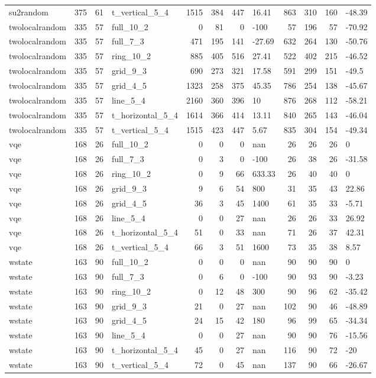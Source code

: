 \begin{longtable}{lrrlrrrlrrrl}
su2random & 375 & 61 & t\_vertical\_5\_4 & 1515 & 384 & 447 & 16.41 & 863 & 310 & 160 & -48.39 \\
twolocalrandom & 335 & 57 & full\_10\_2 & 0 & 81 & 0 & -100 & 57 & 196 & 57 & -70.92 \\
twolocalrandom & 335 & 57 & full\_7\_3 & 471 & 195 & 141 & -27.69 & 632 & 264 & 130 & -50.76 \\
twolocalrandom & 335 & 57 & ring\_10\_2 & 885 & 405 & 516 & 27.41 & 522 & 402 & 215 & -46.52 \\
twolocalrandom & 335 & 57 & grid\_9\_3 & 690 & 273 & 321 & 17.58 & 591 & 299 & 151 & -49.5 \\
twolocalrandom & 335 & 57 & grid\_4\_5 & 1323 & 258 & 375 & 45.35 & 786 & 254 & 138 & -45.67 \\
twolocalrandom & 335 & 57 & line\_5\_4 & 2160 & 360 & 396 & 10 & 876 & 268 & 112 & -58.21 \\
twolocalrandom & 335 & 57 & t\_horizontal\_5\_4 & 1614 & 366 & 414 & 13.11 & 840 & 265 & 143 & -46.04 \\
twolocalrandom & 335 & 57 & t\_vertical\_5\_4 & 1515 & 423 & 447 & 5.67 & 835 & 304 & 154 & -49.34 \\
vqe & 168 & 26 & full\_10\_2 & 0 & 0 & 0 & nan & 26 & 26 & 26 & 0 \\
vqe & 168 & 26 & full\_7\_3 & 0 & 3 & 0 & -100 & 26 & 38 & 26 & -31.58 \\
vqe & 168 & 26 & ring\_10\_2 & 0 & 9 & 66 & 633.33 & 26 & 40 & 40 & 0 \\
vqe & 168 & 26 & grid\_9\_3 & 9 & 6 & 54 & 800 & 31 & 35 & 43 & 22.86 \\
vqe & 168 & 26 & grid\_4\_5 & 36 & 3 & 45 & 1400 & 61 & 35 & 33 & -5.71 \\
vqe & 168 & 26 & line\_5\_4 & 0 & 0 & 27 & nan & 26 & 26 & 33 & 26.92 \\
vqe & 168 & 26 & t\_horizontal\_5\_4 & 51 & 0 & 33 & nan & 71 & 26 & 37 & 42.31 \\
vqe & 168 & 26 & t\_vertical\_5\_4 & 66 & 3 & 51 & 1600 & 73 & 35 & 38 & 8.57 \\
wstate & 163 & 90 & full\_10\_2 & 0 & 0 & 0 & nan & 90 & 90 & 90 & 0 \\
wstate & 163 & 90 & full\_7\_3 & 0 & 6 & 0 & -100 & 90 & 93 & 90 & -3.23 \\
wstate & 163 & 90 & ring\_10\_2 & 0 & 12 & 48 & 300 & 90 & 96 & 62 & -35.42 \\
wstate & 163 & 90 & grid\_9\_3 & 21 & 0 & 27 & nan & 102 & 90 & 46 & -48.89 \\
wstate & 163 & 90 & grid\_4\_5 & 24 & 15 & 42 & 180 & 96 & 99 & 65 & -34.34 \\
wstate & 163 & 90 & line\_5\_4 & 0 & 0 & 27 & nan & 90 & 90 & 76 & -15.56 \\
wstate & 163 & 90 & t\_horizontal\_5\_4 & 45 & 0 & 27 & nan & 116 & 90 & 72 & -20 \\
wstate & 163 & 90 & t\_vertical\_5\_4 & 72 & 0 & 45 & nan & 137 & 90 & 66 & -26.67 \\
\end{longtable}
